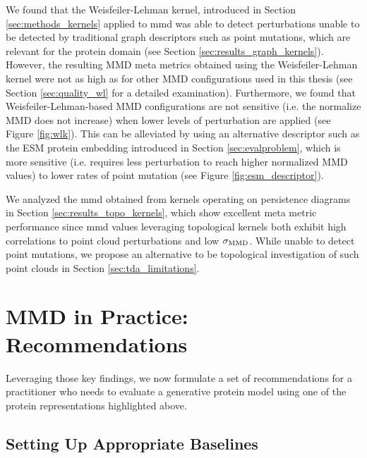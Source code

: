 We found that the Weisfeiler-Lehman kernel, introduced in Section
\ref{sec:methods_kernels} applied to \acrshort{mmd} was able to detect
perturbations unable to be detected by traditional graph descriptors such as
point mutations, which are relevant for the protein domain (see Section
\ref{sec:results_graph_kernels}). However, the resulting MMD meta metrics
obtained using the Weisfeiler-Lehman kernel were not as high as for other MMD
configurations used in this thesis (see Section \ref{sec:quality_wl} for a
detailed examination). Furthermore, we found that Weisfeiler-Lehman-based MMD
configurations are not sensitive (i.e. the normalize MMD does not increase) when
lower levels of perturbation are applied (see Figure \ref{fig:wlk}). This can be
alleviated by using an alternative descriptor such as the ESM protein embedding
introduced in Section \ref{sec:evalproblem}, which is more sensitive (i.e.
requires less perturbation to reach higher normalized MMD values) to lower rates
of point mutation (see Figure \ref{fig:esm_descriptor}).

We analyzed the \acrshort{mmd} obtained from kernels operating on persistence diagrams in
Section \ref{sec:results_topo_kernels}, which show excellent meta metric performance since
\acrshort{mmd} values leveraging topological kernels both exhibit high correlations to
point cloud perturbations and low $\sigma_{\text{MMD}}$. While unable to detect
point mutations, we propose an alternative to be topological investigation of such point
clouds in Section \ref{sec:tda_limitations}.

\section{MMD in Practice: Recommendations}\label{sec:discussion_recommendations}

Leveraging those key findings, we now formulate a set of recommendations for a
practitioner who needs to evaluate a generative protein model using one of the
protein representations highlighted above.


\subsection{Setting Up Appropriate Baselines}\label{sec:discussion_baselines}

